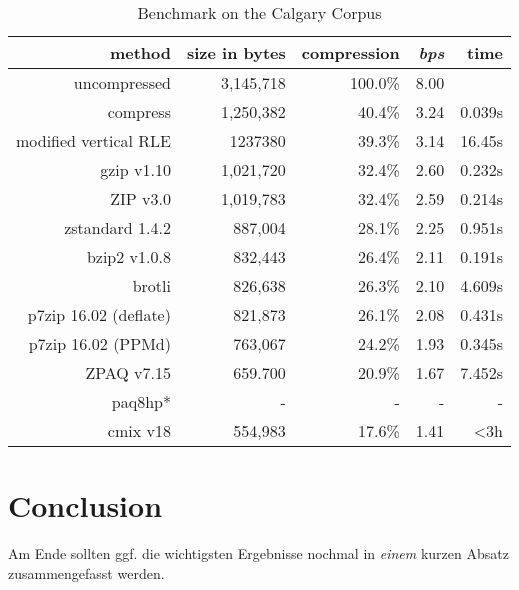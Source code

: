 	\begin{table}[h]
	\begin{tabular}{r|r|r|r|r}
		method  &  size in bytes & compression & \textit{bps}& time\\
		\hline
		uncompressed & 3,145,718 & 100.0\% & 8.00 &\\
		compress & 1,250,382 & 40.4\% & 3.24 & 0.039s\\
		modified vertical RLE & 1237380 & 39.3\%& 3.14 & 16.45s\\
		gzip v1.10 & 1,021,720 & 32.4\% & 2.60 & 0.232s\\
		ZIP v3.0 & 1,019,783 & 32.4\% & 2.59 & 0.214s\\
		zstandard 1.4.2& 887,004 & 28.1\% & 2.25 & 0.951s\\
		bzip2 v1.0.8 & 832,443 & 26.4\% & 2.11 & 0.191s\\
		brotli & 826,638 & 26.3\%& 2.10 & 4.609s\\
		p7zip 16.02 (deflate) &  821,873 & 26.1\% & 2.08 & 0.431s \\
		p7zip 16.02 (PPMd) &  763,067& 24.2\% & 1.93 & 0.345s\\
		ZPAQ v7.15 & 659.700 & 20.9\% & 1.67 & 7.452s \\
		paq8hp* & - & - & - & - \\ 
		cmix v18 & 554,983 & 17.6\% & 1.41 & <3h		
	\end{tabular}
	\label{tab:t100benchmark}
	\caption{Benchmark on the Calgary Corpus}
\end{table}
\section{Conclusion}
\label{ch:Evaluation:sec:Conclusion}

Am Ende sollten ggf. die wichtigsten Ergebnisse nochmal in \emph{einem} kurzen Absatz zusammengefasst werden.


